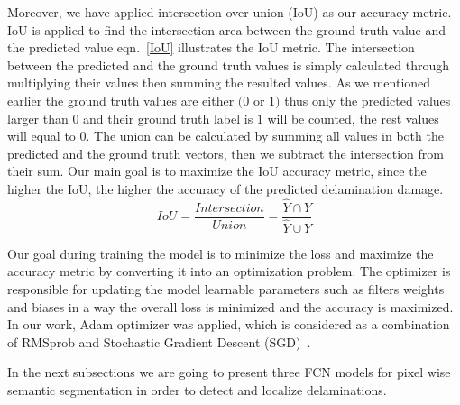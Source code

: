 \documentclass[preprint,9pt]{elsarticle}
\begin{document}
Moreover, we have applied intersection over union (IoU) as our accuracy metric. 
IoU is applied to find the intersection area between the ground truth value and the predicted value eqn.~\ref{IoU} illustrates the IoU metric.
The intersection between the predicted and the ground truth values is simply calculated through multiplying their values then summing the resulted values.
As we mentioned earlier the ground truth values are either \((0\) or \(1)\) thus only the predicted values larger than \(0\) and their ground truth label is \(1\) will be counted, the rest values will equal to \(0\). 
The union can be calculated by summing all values in both the predicted and the ground truth  vectors, then we subtract the intersection from their sum.
Our main goal is to maximize the IoU accuracy metric, since the higher the IoU, the higher the accuracy of the predicted delamination damage.
\begin{equation}
IoU = \frac{Intersection}{Union} = \frac{\hat{Y} \cap Y}{\hat{Y} \cup Y} 
\label{IoU}
\end{equation}

Our goal during training the model is to minimize the loss and maximize the accuracy metric by converting it into an optimization problem. 
The optimizer is responsible for updating the model learnable parameters such as filters weights and biases in a way the overall loss is minimized and the accuracy is maximized.
In our work, Adam optimizer was applied, which is considered as a combination of RMSprob and Stochastic Gradient Descent (SGD)~\cite{Kingma2015}. 

In the next subsections we are going to present three FCN models for pixel wise semantic segmentation in order to detect and localize delaminations.
\end{document}
